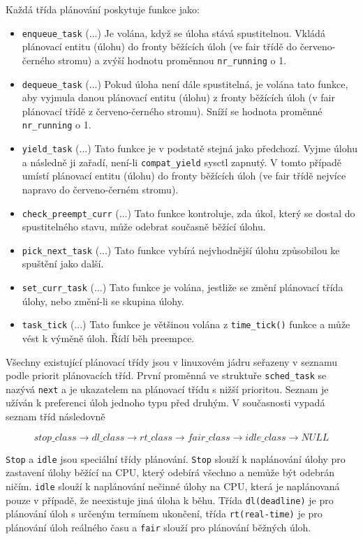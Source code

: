\documentclass[
  master=true,
  font=sans,
  printversion=false,
  joinlists=true,
  figures=true,
  tables=true,
  sourcecodes=false,
  theorems=false,
  bibencoding=utf8,
  language=czech,
  encoding=utf8,
  field=ainfk,
  biblatex,
  glossaries,
  index
]{kidiplom}
\begin{document}
\noindent
Každá třída plánování poskytuje funkce jako:
\begin{itemize}
\item \verb#enqueue_task# (...) 
Je volána, když se úloha stává spustitelnou. Vkládá plánovací entitu (úlohu) do fronty běžících úloh (ve fair třídě do červeno-černého stromu) a zvýší hodnotu proměnnou \verb#nr_running# o 1.
\item \verb#dequeue_task# (...) 
Pokud úloha není dále spustitelná, je volána tato funkce, aby vyjmula danou plánovací entitu (úlohu) z fronty běžících úloh (v fair plánovací třídě z červeno-černého stromu). Sníží se hodnota proměnné \verb#nr_running# o 1.
\item \verb#yield_task# (...) 
Tato funkce je v podstatě stejná jako předchozí. Vyjme úlohu a následně ji zařadí, není-li \verb#compat_yield# sysctl zapnutý. V tomto případě umístí plánovací entitu (úlohu) do fronty běžících úloh (ve fair třídě nejvíce napravo do červeno-černém stromu).
\item \verb#check_preempt_curr# (...) 
Tato funkce kontroluje, zda úkol, který se dostal do spustitelného stavu, může odebrat současně běžící úlohu.
\item \verb#pick_next_task# (...) 
Tato funkce vybírá nejvhodnější úlohu způsobilou ke spuštění jako další.
\item \verb#set_curr_task# (...) 
Tato funkce je volána, jestliže se změní plánovací třída úlohy, nebo změní-li se skupina úlohy.
\item \verb#task_tick# (...) 
Tato funkce je většinou volána z \verb#time_tick()# funkce a může vést k výměně úloh. Řídí běh preempce. \newline
\end{itemize}

Všechny existující plánovací třídy jsou v linuxovém jádru seřazeny v seznamu podle priorit plánovacích tříd. První proměnná ve struktuře \verb#sched_task# se nazývá \verb#next# a je ukazatelem na plánovací třídu s nižší prioritou. Seznam je užíván k preferenci úloh jednoho typu před druhým. V současnosti vypadá seznam tříd následovně

$$ 
stop\_class \rightarrow dl\_class \rightarrow rt\_class \rightarrow fair\_class \rightarrow idle\_class \rightarrow NULL 
$$

\verb#Stop# a \verb#idle# jsou speciální třídy plánování. \verb#Stop# slouží k naplánování úlohy pro zastavení úlohy běžící na CPU, který odebírá všechno a nemůže být odebrán ničím. \verb#idle# slouží k naplánování nečinné úlohy na CPU, která je naplánovaná pouze v případě, že neexistuje jiná úloha k běhu. Třída \verb#dl(deadline)# je pro plánování úloh s určeným termínem ukončení, třída \verb#rt(real-time)# je pro plánování úloh reálného času a \verb#fair# slouží pro plánování běžných úloh.
\end{document}
